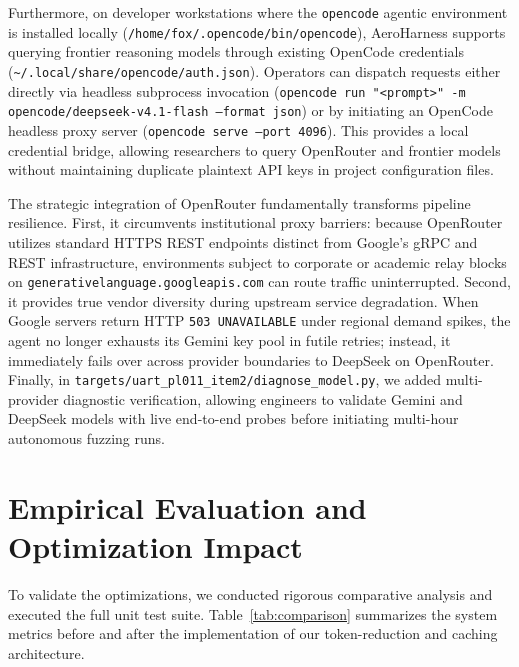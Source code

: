 \documentclass[11pt,a4paper]{article}
\begin{document}
Furthermore, on developer workstations where the \texttt{opencode} agentic environment is installed locally (\texttt{/home/fox/.opencode/bin/opencode}), AeroHarness supports querying frontier reasoning models through existing OpenCode credentials (\texttt{\textasciitilde/.local/share/opencode/auth.json}). Operators can dispatch requests either directly via headless subprocess invocation (\texttt{opencode run "<prompt>" -m opencode/deepseek-v4.1-flash --format json}) or by initiating an OpenCode headless proxy server (\texttt{opencode serve --port 4096}). This provides a local credential bridge, allowing researchers to query OpenRouter and frontier models without maintaining duplicate plaintext API keys in project configuration files.

The strategic integration of OpenRouter fundamentally transforms pipeline resilience. First, it circumvents institutional proxy barriers: because OpenRouter utilizes standard HTTPS REST endpoints distinct from Google's gRPC and REST infrastructure, environments subject to corporate or academic relay blocks on \texttt{generativelanguage.googleapis.com} can route traffic uninterrupted. Second, it provides true vendor diversity during upstream service degradation. When Google servers return HTTP \texttt{503 UNAVAILABLE} under regional demand spikes, the agent no longer exhausts its Gemini key pool in futile retries; instead, it immediately fails over across provider boundaries to DeepSeek on OpenRouter. Finally, in \texttt{targets/uart\_pl011\_item2/diagnose\_model.py}, we added multi-provider diagnostic verification, allowing engineers to validate Gemini and DeepSeek models with live end-to-end probes before initiating multi-hour autonomous fuzzing runs.

\section{Empirical Evaluation and Optimization Impact}

To validate the optimizations, we conducted rigorous comparative analysis and executed the full unit test suite. Table~\ref{tab:comparison} summarizes the system metrics before and after the implementation of our token-reduction and caching architecture.
\end{document}
